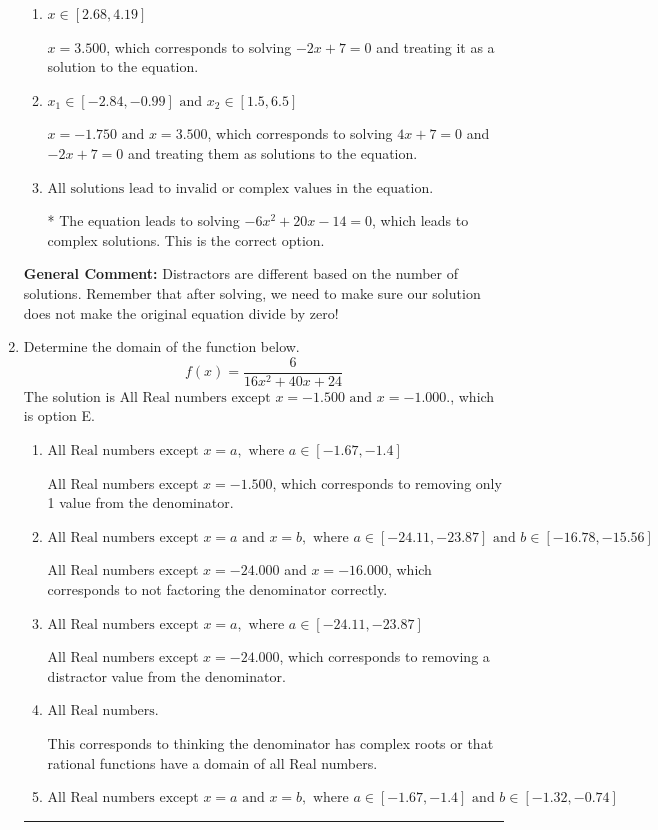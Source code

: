 \documentclass{extbook}[14pt]
\newcommand{\litem}[1]{\item #1

\rule{\textwidth}{0.4pt}}
\begin{document}
\begin{enumerate}
{\begin{enumerate}[label=\Alph*.]
$x = -1.750$, which corresponds to solving $4x + 7 = 0$ and treating it as a solution to the equation.
\item \( x \in [2.68,4.19] \)

$x = 3.500$, which corresponds to solving $-2x + 7 = 0$ and treating it as a solution to the equation.
\item \( x_1 \in [-2.84, -0.99] \text{ and } x_2 \in [1.5,6.5] \)

$x = -1.750 \text{ and } x = 3.500$, which corresponds to solving $4x + 7 = 0$ and $-2x + 7 = 0$ and treating them as solutions to the equation.
\item \( \text{All solutions lead to invalid or complex values in the equation.} \)

* The equation leads to solving $-6x^{2} +20 x -14=0$, which leads to complex solutions. This is the correct option.
\end{enumerate}

\textbf{General Comment:} Distractors are different based on the number of solutions. Remember that after solving, we need to make sure our solution does not make the original equation divide by zero!
}
\litem{
Determine the domain of the function below.
\[ f(x) = \frac{6}{16x^{2} +40 x + 24} \]The solution is \( \text{All Real numbers except } x = -1.500 \text{ and } x = -1.000. \), which is option E.\begin{enumerate}[label=\Alph*.]
\item \( \text{All Real numbers except } x = a, \text{ where } a \in [-1.67, -1.4] \)

All Real numbers except $x = -1.500$, which corresponds to removing only 1 value from the denominator.
\item \( \text{All Real numbers except } x = a \text{ and } x = b, \text{ where } a \in [-24.11, -23.87] \text{ and } b \in [-16.78, -15.56] \)

All Real numbers except $x = -24.000$ and $x = -16.000$, which corresponds to not factoring the denominator correctly.
\item \( \text{All Real numbers except } x = a, \text{ where } a \in [-24.11, -23.87] \)

All Real numbers except $x = -24.000$, which corresponds to removing a distractor value from the denominator.
\item \( \text{All Real numbers.} \)

This corresponds to thinking the denominator has complex roots or that rational functions have a domain of all Real numbers.
\item \( \text{All Real numbers except } x = a \text{ and } x = b, \text{ where } a \in [-1.67, -1.4] \text{ and } b \in [-1.32, -0.74] \)


\end{enumerate}}
\end{enumerate}
\end{document}
